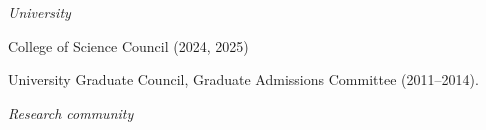 \documentclass[11pt]{article}
\newcommand{\shead}[1]{\vspace{12.5pt}\centerline{{\bf{#1}}}}
\newcommand{\sheadalt}[1]{\vspace{10pt}\hspace{0.5in}{\it{#1}}}
\begin{document}
\vspace{-2.75pt}
\centerline{\em University}

\begin{list}{\mbox{}}{%
\setlength{\partopsep}{0.0in}%
\setlength{\itemindent}{-0.7in}%
\setlength{\leftmargin}{1.2in}%
\setlength{\parsep}{-2.75pt}
}
\vspace{-16.5pt}
\item
  College of Science Council (2024, 2025)
\item
University Graduate Council, Graduate Admissions Committee (2011--2014).

\end{list}



\vspace{-2.75pt}
\centerline{\em Research community}
\end{document}
